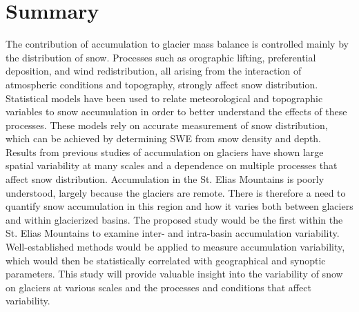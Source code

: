 \documentclass[12pt]{article}
\begin{document}
\section{Summary}
The contribution of accumulation to glacier mass balance is controlled mainly by the distribution of snow. Processes such as orographic lifting, preferential deposition, and wind redistribution, all arising from the interaction of atmospheric conditions and topography, strongly affect snow distribution. Statistical models have been used to relate meteorological and topographic variables to snow accumulation in order to better understand the effects of these processes. These models rely on accurate measurement of snow distribution, which can be achieved by determining SWE from snow density and depth. Results from previous studies of accumulation on glaciers have shown large spatial variability at many scales and a dependence on multiple processes that affect snow distribution. Accumulation in the St. Elias Mountains is poorly understood, largely because the glaciers are remote. There is therefore a need to quantify snow accumulation in this region and how it varies both between glaciers and within glacierized basins. The proposed study would be the first within the St. Elias Mountains to examine inter- and intra-basin accumulation variability. Well-established methods would be applied to measure accumulation variability, which would then be statistically correlated with geographical and synoptic parameters. This study will provide valuable insight into the variability of snow on glaciers at various scales and the processes and conditions that affect variability. 

\pagebreak


\end{document}
